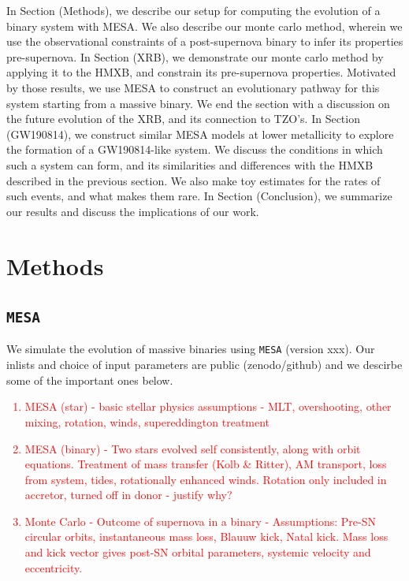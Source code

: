 \documentclass[linenumbers,trackchanges,twocolumn]{aastex701}
\newcommand{\red}{\textcolor{red}}
\begin{document}
In Section (Methods), we describe our setup for computing the evolution of a binary system with MESA. We also describe our monte carlo method, wherein we use the observational constraints of a post-supernova binary to infer its properties pre-supernova. In Section (XRB), we demonstrate our monte carlo method by applying it to the HMXB, and constrain its pre-supernova properties. Motivated by those results, we use MESA to construct an evolutionary pathway for this system starting from a massive binary. We end the section with a discussion on the future evolution of the XRB, and its connection to TZO's. In Section (GW190814), we construct similar MESA models at lower metallicity to explore the formation of a GW190814-like system. We discuss the conditions in which such a system can form, and its similarities and differences with the HMXB described in the previous section. We also make toy estimates for the rates of such events, and what makes them rare. In Section (Conclusion), we summarize our results and discuss the implications of our work.

\section{Methods} \label{sec:methods}

\subsection{\texttt{MESA}}

We simulate the evolution of massive binaries using \texttt{MESA} (version xxx). Our inlists and choice of input parameters are public (zenodo/github) and we descirbe some of the important ones below.

\red{
\begin{enumerate}
    \item MESA (star) - basic stellar physics assumptions - MLT, overshooting, other mixing, rotation, winds, supereddington treatment
    \item MESA (binary) - Two stars evolved self consistently, along with orbit equations. Treatment of mass transfer (Kolb \& Ritter), AM transport, loss from system, tides, rotationally enhanced winds. Rotation only included in accretor, turned off in donor - justify why?
    \item Monte Carlo - Outcome of supernova in a binary - Assumptions: Pre-SN circular orbits, instantaneous mass loss, Blauuw kick, Natal kick. Mass loss and kick vector gives post-SN orbital parameters, systemic velocity and eccentricity.
\end{enumerate}
}
\end{document}
